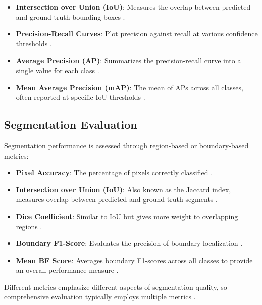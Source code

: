 \begin{itemize}
    \item \textbf{Intersection over Union (IoU)}: Measures the overlap between predicted and ground truth bounding boxes \cite{everingham2010pascal}.
    
    \item \textbf{Precision-Recall Curves}: Plot precision against recall at various confidence thresholds \cite{everingham2010pascal}.
    
    \item \textbf{Average Precision (AP)}: Summarizes the precision-recall curve into a single value for each class \cite{everingham2010pascal}.
    
    \item \textbf{Mean Average Precision (mAP)}: The mean of APs across all classes, often reported at specific IoU thresholds \cite{lin2014microsoft}.
\end{itemize}

\subsection{Segmentation Evaluation}
Segmentation performance is assessed through region-based or boundary-based metrics:

\begin{itemize}
    \item \textbf{Pixel Accuracy}: The percentage of pixels correctly classified \cite{long2015fully}.
    
    \item \textbf{Intersection over Union (IoU)}: Also known as the Jaccard index, measures overlap between predicted and ground truth segments \cite{jaccard1912distribution}.
    
    \item \textbf{Dice Coefficient}: Similar to IoU but gives more weight to overlapping regions \cite{dice1945measures}.
    
    \item \textbf{Boundary F1-Score}: Evaluates the precision of boundary localization \cite{csurka2013good}.
    
    \item \textbf{Mean BF Score}: Averages boundary F1-scores across all classes to provide an overall performance measure \cite{perazzi2016benchmark}.
\end{itemize}

Different metrics emphasize different aspects of segmentation quality, so comprehensive evaluation typically employs multiple metrics \cite{taha2015metrics}.

